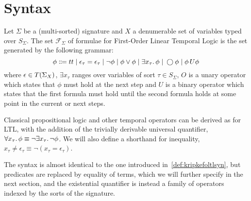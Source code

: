 \section{Syntax}

\begin{definition}
Let $\Sigma$ be a (multi-sorted) signature and $X$ a denumerable set of variables typed over $S_\Sigma$. The set
$\mathcal{F}_\Sigma$ of formulae for First-Order Linear Temporal Logic is the set generated by the following grammar:
\[
  \phi \Coloneqq tt \;|\; \epsilon_\tau = \epsilon_\tau
                    \;|\; \neg\phi
                    \;|\; \phi \lor \phi
                    \;|\; \exists {x_\tau} \ldotp {\phi}
                    \;|\; \bigcirc{\phi}
                    \;|\; {\phi}\,U {\phi}
\]
where $\epsilon \in T({\Sigma}_{X})$, $\exists x_\tau$ ranges over variables of sort $\tau \in S_\Sigma$,
$O$ is a unary operator which states that $\phi$ must hold at the next step and $U$ is a binary operator which states
that the first formula must hold until the second formula holds at some point in the current or next steps.
\end{definition}

Classical propositional logic and other temporal operators can be derived as for LTL, with the addition of the trivially
derivable universal quantifier, $\forall {x_\tau} \ldotp {\phi} \equiv \neg\exists {x_\tau} \ldotp {\neg\phi}$. We will also define a
shorthand for inequality, $x_\tau \neq \epsilon_\tau \equiv \neg(x_\tau = \epsilon_\tau)$.

The syntax is almost identical to the one introduced in~\autoref{def:kripkefoltlsyn}, but predicates are replaced by
equality of terms, which we will further specify in the next section, and the existential quantifier is instead a family
of operators indexed by the sorts of the signature.

